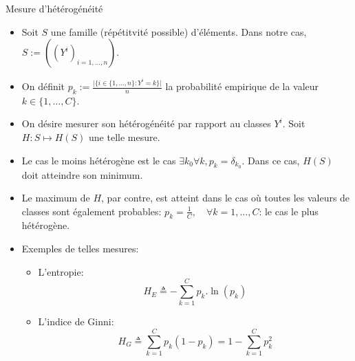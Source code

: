 \documentclass[8pt]{beamer}
\begin{document}
			\begin{frame}{Mesure d'hétérogénéité}
				\begin{itemize}
					\item<1-> Soit \(S\) une famille (répétitvité possible) d'éléments. Dans notre cas, \(S := ((Y^i)_{i=1,\dots,n})\).
					\item<2-> On définit \(p_k := \frac{\vert \big\{i \in \{1,\dots,n\}: Y^i = k\big\}\vert}{n}\) la probabilité empirique de la valeur \(k \in \{1,\dots,C\}\).
					\item<3-> On désire mesurer son hétérogénéité par rapport au classes \(Y^i\). Soit \(H: S\mapsto H(S)\) une telle mesure.
					\item<4-> Le cas le moins hétérogène est le cas \(\exists k_0 \forall k, p_k = \delta_{k_0}\). Dans ce cas, \(H(S)\) doit atteindre son minimum.
					\item<5-> Le maximum de \(H\), par contre, est atteint dans le cas où toutes les valeurs de classes sont également probables: \(p_k = \frac{1}{C}, \quad \forall k=1,\dots,C\): le cas le plus hétérogène.
					\item<6-> Exemples de telles mesures:
						\begin{itemize}
							\item L'entropie:
								\begin{equation}
									H_E \triangleq - \sum_{k=1}^C p_k . \ln(p_k)
								\end{equation}
							\item L'indice de Ginni:
								\begin{equation}
									H_G \triangleq \sum_{k=1}^C p_k(1-p_k) = 1 - \sum_{k=1}^C p_k^2
								\end{equation}
						\end{itemize}
				\end{itemize}
			\end{frame}
\end{document}
